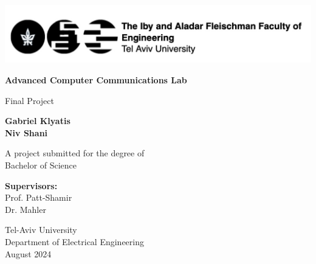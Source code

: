 \documentclass{report}
\begin{document}
\begin{titlepage}

    \centering
    \includegraphics[width=1\textwidth]{UniversityLogo.jpeg}\\
    \vspace*{1cm}
    
    \Huge
    \textbf{Advanced Computer Communications Lab}
    
    \vspace{0.5cm}
    \LARGE
    Final Project
    
    \vspace{1cm}
    
    \textbf{Gabriel Klyatis\\Niv Shani}

    \vspace{0.8cm}
        
    A project submitted for the degree of\\
    Bachelor of Science 
    
    \vspace{0.8cm}
    
    \textbf{Supervisors:}\\
    Prof. Patt-Shamir\\
    Dr. Mahler
    \vspace{0.8cm}
    
    \Large
    Tel-Aviv University\\
    Department of Electrical Engineering\\
    August 2024
    
\end{titlepage}



\tableofcontents{}













\end{document}
